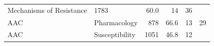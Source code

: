 \documentclass[11pt,]{article}
\begin{document}
\begin{longtable}[]{@{}llrrrr@{}}
\begin{minipage}[t]{0.43\columnwidth}
Mechanisms of Resistance\strut
\end{minipage} & \begin{minipage}[t]{0.04\columnwidth}\raggedleft\strut
1783\strut
\end{minipage} & \begin{minipage}[t]{0.08\columnwidth}\raggedleft\strut
60.0\strut
\end{minipage} & \begin{minipage}[t]{0.11\columnwidth}\raggedleft\strut
14\strut
\end{minipage} & \begin{minipage}[t]{0.11\columnwidth}\raggedleft\strut
36\strut
\end{minipage}\tabularnewline
\begin{minipage}[t]{0.06\columnwidth}\raggedright\strut
AAC\strut
\end{minipage} & \begin{minipage}[t]{0.43\columnwidth}\raggedright\strut
Pharmacology\strut
\end{minipage} & \begin{minipage}[t]{0.04\columnwidth}\raggedleft\strut
878\strut
\end{minipage} & \begin{minipage}[t]{0.08\columnwidth}\raggedleft\strut
66.6\strut
\end{minipage} & \begin{minipage}[t]{0.11\columnwidth}\raggedleft\strut
13\strut
\end{minipage} & \begin{minipage}[t]{0.11\columnwidth}\raggedleft\strut
29\strut
\end{minipage}\tabularnewline
\begin{minipage}[t]{0.06\columnwidth}\raggedright\strut
AAC\strut
\end{minipage} & \begin{minipage}[t]{0.43\columnwidth}\raggedright\strut
Susceptibility\strut
\end{minipage} & \begin{minipage}[t]{0.04\columnwidth}\raggedleft\strut
1051\strut
\end{minipage} & \begin{minipage}[t]{0.08\columnwidth}\raggedleft\strut
46.8\strut
\end{minipage} & \begin{minipage}[t]{0.11\columnwidth}\raggedleft\strut
12\strut
\end{minipage} & \begin{minipage}[t]{0.11\columnwidth}\raggedleft\strut

\end{minipage}
\end{longtable}
\end{document}
